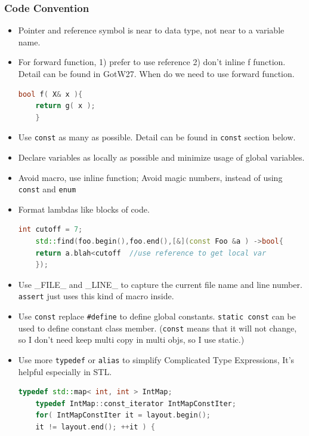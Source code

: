 \documentclass[a4paper,12pt,twoside]{book}
\begin{document}
\subsubsection{Code Convention}
\begin{itemize}
	
	\item Pointer and reference symbol is near to data type, not near to a variable name.
	
	
	
	\item For forward function, 1) prefer to use reference 2) don't inline f function. Detail can be found in GotW27. When do we need to use forward function.
	
	\begin{lstlisting}[frame=single, language=c++]
	bool f( X& x ){
	return g( x );
	}
	\end{lstlisting}
	
	\item Use \texttt{const} as many as possible. Detail can be found in \texttt{const} section below. 
	
	\item Declare variables as locally as possible and minimize usage of global variables.
	
	\item Avoid macro, use inline function;  Avoid magic numbers, instead of using \texttt{const} and \texttt{enum}
	
	\item Format lambdas like blocks of code.
	\begin{lstlisting}[frame=single, language=c++]
	int cutoff = 7;
	std::find(foo.begin(),foo.end(),[&](const Foo &a ) ->bool{
	return a.blah<cutoff  //use reference to get local var
	});
	\end{lstlisting}
	
	
	\item Use \_FILE\_ and \_LINE\_ to capture the current file name and line number.  \texttt{assert} just uses this kind of macro inside.
	
	\item Use \texttt{const} replace \texttt{\#define} to define global constants. \texttt{static const} can be used to define constant class member. (\texttt{const} means that it will not change, so I don't need keep multi copy in multi objs, so I use static.)
	
	\item Use more \texttt{typedef} or \texttt{alias} to simplify Complicated Type Expressions, It's helpful especially in STL. 
	\begin{lstlisting}[frame=single, language=c++]
	typedef std::map< int, int > IntMap;
	typedef IntMap::const_iterator IntMapConstIter;
	for( IntMapConstIter it = layout.begin();
	it != layout.end(); ++it ) {
	

\end{lstlisting}
\end{itemize}
\end{document}

